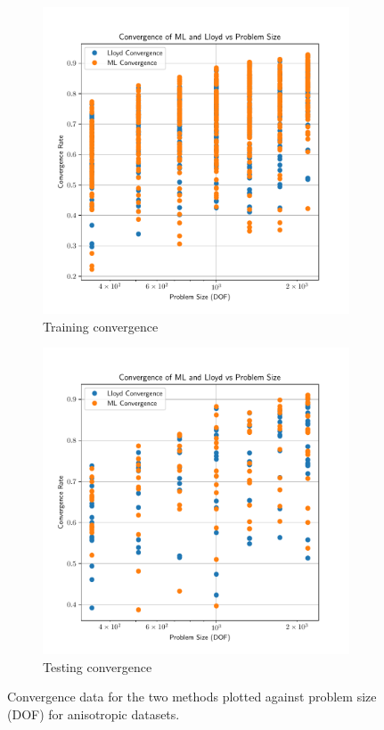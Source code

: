 \documentclass{article}
\begin{document}
\bigskip\bigskip
\begin{figure}[!htb]
  \centering
  \begin{subfigure}[t]{0.49\textwidth}
    \centering
    \includegraphics[width=\textwidth]{aniso3d_train_convergence_per_size.pdf}
    \caption{Training convergence}
  \end{subfigure}
  \begin{subfigure}[t]{0.49\textwidth}
    \centering
    \includegraphics[width=\textwidth]{aniso3d_test_convergence_per_size.pdf}
    \caption{Testing convergence}
  \end{subfigure}
  \caption{Convergence data for the two methods plotted against problem size (DOF) for anisotropic datasets.}
  \label{fig:aniso_conv_per_size}
\end{figure}
\end{document}
